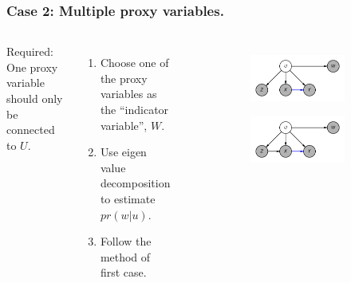 \documentclass{beamer}
\begin{document}
\begin{frame}
\frametitle{Case 2: Multiple proxy variables.}
\begin{columns}
	Required: One proxy variable should only be connected to $ U $.

	\bigskip

	\begin{enumerate}
		\item Choose one of the proxy variables as the ``indicator variable'', $ W $.
		\item Use eigen value decomposition to estimate $ pr(w | u) $.
		\item Follow the method of first case.
	\end{enumerate}


    \begin{figure}
	\begin{subfigure}{0.5\textwidth}
    		\centering
    		\includegraphics[scale=0.6]{scripts/double_proxy.png}
	\end{subfigure}
	\begin{subfigure}{0.5\textwidth}
    		\centering
    		\includegraphics[scale=0.6]{scripts/double_proxy_with_extra_edge.png}
	\end{subfigure}
    \end{figure}

\end{columns}

\end{frame}
\end{document}
